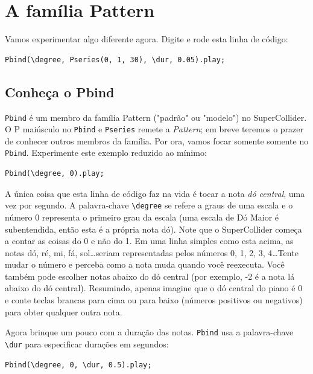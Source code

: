 \section{A família Pattern}

Vamos experimentar algo diferente agora. Digite e rode esta linha de código:

\begin{lstlisting}[style=SuperCollider-IDE, basicstyle=\scttfamily\footnotesize]
Pbind(\degree, Pseries(0, 1, 30), \dur, 0.05).play;
\end{lstlisting}

\subsection{Conheça o Pbind}

\texttt{Pbind} é um membro da família Pattern ("padrão" ou "modelo") no SuperCollider. O P maiúsculo no \texttt{Pbind} e \texttt{Pseries} remete a \emph{Pattern}; em breve teremos o prazer de conhecer outros membros da família. Por ora, vamos focar somente somente no \texttt{Pbind}. Experimente este exemplo reduzido ao mínimo:

\begin{lstlisting}[style=SuperCollider-IDE, basicstyle=\scttfamily\footnotesize]
Pbind(\degree, 0).play;
\end{lstlisting}

A única coisa que esta linha de código faz na vida é tocar a nota \emph{dó central}, uma vez por segundo. A palavra-chave \texttt{\textbackslash degree} se refere a graus de uma escala e o número 0 representa o primeiro grau da escala (uma escala de Dó Maior é subentendida, então esta é a própria nota dó). Note que o SuperCollider começa a contar as coisas do 0 e não do 1. Em uma linha simples como esta acima, as notas dó, ré, mi, fá, sol\dots seriam representadas pelos números 0, 1, 2, 3, 4\dots Tente mudar o número e perceba como a nota muda quando você reexecuta. Você também pode escolher notas abaixo do dó central (por exemplo, -2 é a nota lá abaixo do dó central). Resumindo, apenas imagine que o dó central do piano é 0 e conte teclas brancas para cima ou para baixo (números positivos ou negativos) para obter qualquer outra nota.

Agora brinque um pouco com a duração das notas. \texttt{Pbind} usa a palavra-chave \texttt{\textbackslash dur} para especificar durações em segundos:

\begin{lstlisting}[style=SuperCollider-IDE, basicstyle=\scttfamily\footnotesize]
Pbind(\degree, 0, \dur, 0.5).play;
\end{lstlisting}

